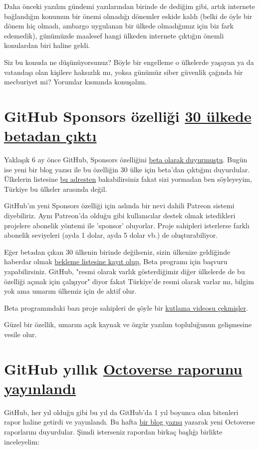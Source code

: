 \documentclass[11pt]{article}
\begin{document}
Daha önceki yazılım gündemi yazılarından birinde de dediğim gibi, artık
internete bağlandığın konumun bir önemi olmadığı dönemler eskide kaldı (belki
de öyle bir dönem hiç olmadı, ambargo uygulanan bir ülkede olmadığımız için biz
fark edemedik), günümüzde maalesef hangi ülkeden internete çıktığın önemli
konulardan biri haline geldi.

Siz bu konuda ne düşünüyorsunuz? Böyle bir engelleme o ülkelerde yaşayan ya da
vatandaşı olan kişilere haksızlık mı, yoksa günümüz siber güvenlik çağında bir
mecburiyet mi? Yorumlar kısmında konuşalım.
\section{GitHub Sponsors özelliği \href{https://github.blog/2019-11-04-github-sponsors-is-now-out-of-beta-in-30-countries/}{30 ülkede betadan çıktı}}
\label{sec:org770d9c5}
Yaklaşık 6 ay önce GitHub, Sponsors özelliğini \href{https://techcrunch.com/2019/05/23/github-launches-sponsors-lets-you-pay-your-favorite-open-source-contributors/}{beta olarak duyurmuştu}. Bugün
ise yeni bir blog yazısı ile bu özelliğin 30 ülke için beta'dan çıktığını
duyurdular. Ülkelerin listesine \href{https://help.github.com/en/github/supporting-the-open-source-community-with-github-sponsors/becoming-a-sponsored-developer\#submitting-your-bank-and-tax-information}{bu adresten} bakabilirsiniz fakat sizi yormadan
ben söyleyeyim, Türkiye bu ülkeler arasında değil.

GitHub'ın yeni Sponsors özelliği için aslında bir nevi dahili Patreon sistemi
diyebiliriz. Aynı Patreon'da olduğu gibi kullanıcılar destek olmak istedikleri
projelere abonelik yöntemi ile 'sponsor' oluyorlar. Proje sahipleri isterlerse
farklı abonelik seviyeleri (ayda 1 dolar, ayda 5 dolar vb.) de oluşturabiliyor.

Eğer betadan çıkan 30 ülkenin birinde değilseniz, sizin ülkenize geldiğinde
haberdar olmak \href{https://github.com/sponsors}{bekleme listesine kayıt olup}, Beta programı için başvuru
yapabilirsiniz. GitHub, "resmi olarak varlık gösterdiğimiz diğer ülkelerde de
bu özelliği açmak için çalışıyor" diyor fakat Türkiye'de resmi olarak varlar
mı, bilgim yok ama umarım ülkemiz için de aktif olur.

Beta programındaki bazı proje sahipleri de şöyle bir \href{https://www.youtube.com/watch?v=7YcW25PHnAA}{kutlama videosu çekmişler}.

Güzel bir özellik, umarım açık kaynak ve özgür yazılım topluluğunun gelişmesine
vesile olur.
\section{GitHub yıllık \href{https://octoverse.github.com/}{Octoverse raporunu yayınlandı}}
\label{sec:org836ccdf}
GitHub, her yıl olduğu gibi bu yıl da GitHub'da 1 yıl boyunca olan bitenleri
rapor haline getirdi ve yayınlandı. Bu hafta \href{https://github.blog/2019-11-06-the-state-of-the-octoverse-2019/}{bir blog yazısı} yazarak yeni
Octoverse raporlarını duyurdular. Şimdi isterseniz rapordan birkaç başlığı
birlikte inceleyelim:
\end{document}
